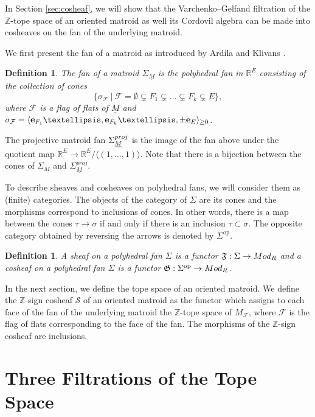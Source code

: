 \documentclass{amsart}
\newtheorem{definition}[theorem]{Definition}
\newcommand\Fcal{{\mathcal F}}
\newcommand\Scal{{\mathcal S}}
\newcommand\ee{{\bf e}}
\newcommand\RR{{\mathbb R}}
\newcommand\ZZ{{\mathbb Z}}
\newcommand\pj{{\rm proj}}
\begin{document}
{In Section \ref{sec:cosheaf}, we will show that the Varchenko--Gelfand filtration of the $\ZZ$-tope space of an oriented matroid as well its Cordovil algebra can be made into cosheaves on the fan of the underlying matroid. 

We first present the fan of a matroid as introduced by Ardila and Klivans \cite{AK06}. 

\begin{definition}\label{def:matfan}
The fan of a matroid $\Sigma_{\underline{M}}$ is the polyhedral fan in $\RR^E$ consisting of the collection of cones 
$$\{ \sigma_{\mathcal{F}} \ | \ \mathcal{F} = \emptyset \subsetneq F_1 \subsetneq \dots \subsetneq F_k \subsetneq E \},$$ 
where $\mathcal{F}$ is a flag of flats of $\underline{M}$ and 
$\sigma_{\mathcal{F}} = \langle \ee_{F_1} \dots, \ee_{F_k} \dots, \pm \ee_E\rangle_{\geq 0}$.
\end{definition}

The projective matroid fan $\Sigma^{\pj}_{\underline{M}}$ is the image of the fan above under the quotient map 
$\RR^E \to \RR^E / \langle (1 ,\dots, 1) \rangle.$ Note that there is a bijection between the cones of $\Sigma_M$ and $\Sigma^{proj}_{\underline{M}}$. 

To describe sheaves and cosheaves on polyhedral fans, we will consider them as (finite) categories. The objects of the category of $\Sigma$ are its cones and the morphisms correspond to inclusions of cones. In other words, there is a map between the cones $\tau \to \sigma$ if and only if there is an inclusion $\tau  \subset \sigma$. The opposite category obtained by reversing the arrows is denoted by $\Sigma^{\text{op}}$. 

\begin{definition}\label{def:sheaf}
A sheaf on a polyhedral fan $\Sigma$ is a functor 
$\mathfrak{F} : \Sigma \to {\rm Mod_R}$
and a cosheaf on a polyhedral fan $\Sigma$ is a functor 
$\mathfrak{G} : \Sigma^{\text{op}} \to {\rm Mod}_R$.
\end{definition}

In the next section, we define the tope space of an oriented matroid. We define the $\ZZ$-sign cosheaf $\Scal$ of an oriented matroid as the functor which assigns to each face of the fan of the underlying matroid the $\ZZ$-tope space of $M_\Fcal$, where $\Fcal$ is the flag of flats corresponding to the face of the fan. The morphisms of the $\ZZ$-sign cosheaf are inclusions. 

\section{Three Filtrations of the Tope Space}

}
\end{document}
